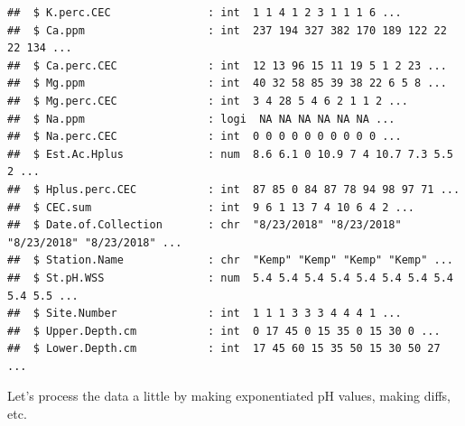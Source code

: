 \documentclass[]{article}
\newenvironment{Shaded}{\begin{snugshade}}{\end{snugshade}}
\newcommand{\DecValTok}[1]{\textcolor[rgb]{0.00,0.00,0.81}{#1}}
\newcommand{\KeywordTok}[1]{\textcolor[rgb]{0.13,0.29,0.53}{\textbf{#1}}}
\newcommand{\NormalTok}[1]{#1}
\newcommand{\OperatorTok}[1]{\textcolor[rgb]{0.81,0.36,0.00}{\textbf{#1}}}
\newcommand{\StringTok}[1]{\textcolor[rgb]{0.31,0.60,0.02}{#1}}
\begin{document}
\begin{verbatim}
##  $ K.perc.CEC               : int  1 1 4 1 2 3 1 1 1 6 ...
##  $ Ca.ppm                   : int  237 194 327 382 170 189 122 22 22 134 ...
##  $ Ca.perc.CEC              : int  12 13 96 15 11 19 5 1 2 23 ...
##  $ Mg.ppm                   : int  40 32 58 85 39 38 22 6 5 8 ...
##  $ Mg.perc.CEC              : int  3 4 28 5 4 6 2 1 1 2 ...
##  $ Na.ppm                   : logi  NA NA NA NA NA NA ...
##  $ Na.perc.CEC              : int  0 0 0 0 0 0 0 0 0 0 ...
##  $ Est.Ac.Hplus             : num  8.6 6.1 0 10.9 7 4 10.7 7.3 5.5 2 ...
##  $ Hplus.perc.CEC           : int  87 85 0 84 87 78 94 98 97 71 ...
##  $ CEC.sum                  : int  9 6 1 13 7 4 10 6 4 2 ...
##  $ Date.of.Collection       : chr  "8/23/2018" "8/23/2018" "8/23/2018" "8/23/2018" ...
##  $ Station.Name             : chr  "Kemp" "Kemp" "Kemp" "Kemp" ...
##  $ St.pH.WSS                : num  5.4 5.4 5.4 5.4 5.4 5.4 5.4 5.4 5.4 5.5 ...
##  $ Site.Number              : int  1 1 1 3 3 3 4 4 4 1 ...
##  $ Upper.Depth.cm           : int  0 17 45 0 15 35 0 15 30 0 ...
##  $ Lower.Depth.cm           : int  17 45 60 15 35 50 15 30 50 27 ...
\end{verbatim}

Let's process the data a little by making exponentiated pH values,
making diffs, etc.

\begin{Shaded}
\end{Shaded}
\end{document}
